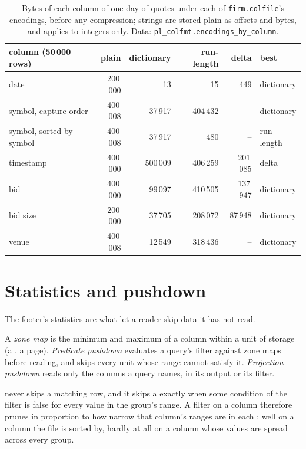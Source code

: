 \begin{table}[ht]
\centering\small
\begin{tabular}{lrrrrl}
\toprule
column (50\,000 rows) & plain & dictionary & run-length & delta & best \\
\midrule
date & 200\,000 & 13 & 15 & 449 & dictionary \\
symbol, capture order & 400\,008 & 37\,917 & 404\,432 & -- & dictionary \\
symbol, sorted by symbol & 400\,008 & 37\,917 & 480 & -- & run-length \\
timestamp & 400\,000 & 500\,009 & 406\,259 & 201\,085 & delta \\
bid & 400\,000 & 99\,097 & 410\,505 & 137\,947 & dictionary \\
bid size & 200\,000 & 37\,705 & 208\,072 & 87\,948 & dictionary \\
venue & 400\,008 & 12\,549 & 318\,436 & -- & dictionary \\
\bottomrule
\end{tabular}
\caption{Bytes of each column of one day of quotes under each of \texttt{firm.colfile}'s encodings, before any compression;
strings are stored plain as offsets and bytes, and  applies to integers only. Data:
\texttt{pl\_colfmt.encodings\_by\_column}.}\label{tab:pl:columnar-formats:encodings}
\end{table}

\section{Statistics and pushdown}

The footer's statistics are what let a reader skip data it has not read.

\begin{definition}\label{def:pl:columnar-formats:pushdown}
A \emph{zone map} is the minimum and maximum of a column within a unit of storage (a , a page).
\emph{Predicate pushdown} evaluates a query's filter against zone maps before reading, and skips every
unit whose range cannot satisfy it. \emph{Projection pushdown} reads only the columns a query names,
in its output or its filter.
\end{definition}

\begin{proposition}\label{prop:pl:columnar-formats:pruning}
 never skips a matching row, and it skips a  exactly when some condition of the filter is false for
every value in the group's range. A filter on a column therefore prunes in proportion to how narrow that column's ranges are in
each : well on a column the file is sorted by, hardly at all on a column whose values are spread across every group.
\end{proposition}

